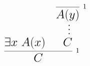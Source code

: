 \documentclass[14pt,border=2pt]{standalone}
\begin{document}
        $$
        \LARGE 

\begin{prooftree}
\hypo{\exists x~ A(x)}
\infer0[\normalsize 1]{A(y)}
\ellipsis{}{C}
\infer2[\normalsize 1]{C}
\end{prooftree}
        $$
        
\end{document}
